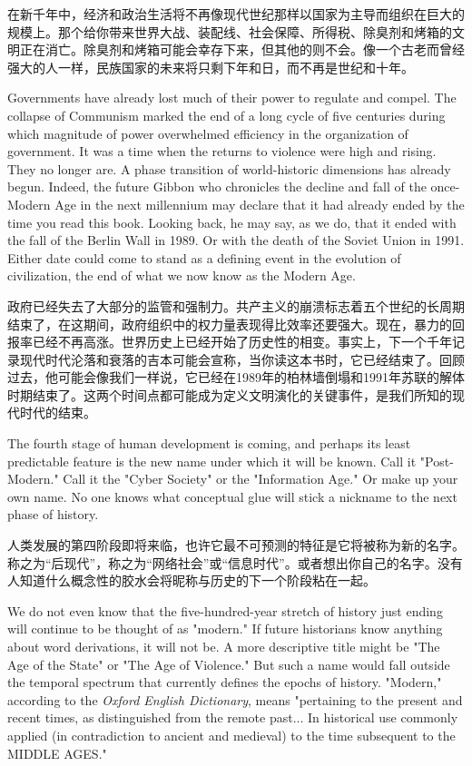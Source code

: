 \begin{Parallel}{97mm}{45mm}
  \ParallelRText
  {在新千年中，经济和政治生活将不再像现代世纪那样以国家为主导而组织在巨大的规模上。那个给你带来世界大战、装配线、社会保障、所得税、除臭剂和烤箱的文明正在消亡。除臭剂和烤箱可能会幸存下来，但其他的则不会。像一个古老而曾经强大的人一样，民族国家的未来将只剩下年和日，而不再是世纪和十年。}

  \ParallelPar

  \ParallelLText
  {Governments have already lost much of their power to regulate and compel. The collapse of Communism marked the end of a long cycle of five centuries during which magnitude of power overwhelmed efficiency in the organization of government. It was a time when the returns to violence were high and rising. They no longer are. A phase transition of world-historic dimensions has already begun. Indeed, the future Gibbon who chronicles the decline and fall of the once-Modern Age in the next millennium may declare that it had already ended by the time you read this book. Looking back, he may say, as we do, that it ended with the fall of the Berlin Wall in 1989. Or with the death of the Soviet Union in 1991. Either date could come to stand as a defining event in the evolution of civilization, the end of what we now know as the Modern Age.}

  \ParallelRText
  {政府已经失去了大部分的监管和强制力。共产主义的崩溃标志着五个世纪的长周期结束了，在这期间，政府组织中的权力量表现得比效率还要强大。现在，暴力的回报率已经不再高涨。世界历史上已经开始了历史性的相变。事实上，下一个千年记录现代时代沦落和衰落的吉本可能会宣称，当你读这本书时，它已经结束了。回顾过去，他可能会像我们一样说，它已经在1989年的柏林墙倒塌和1991年苏联的解体时期结束了。这两个时间点都可能成为定义文明演化的关键事件，是我们所知的现代时代的结束。}

  \ParallelPar

  \ParallelLText
  {The fourth stage of human development is coming, and perhaps its least predictable feature is the new name under which it will be known. Call it "Post-Modern." Call it the "Cyber Society" or the "Information Age." Or make up your own name. No one knows what conceptual glue will stick a nickname to the next phase of history.}
  
  \ParallelRText
  {人类发展的第四阶段即将来临，也许它最不可预测的特征是它将被称为新的名字。称之为“后现代”，称之为“网络社会”或“信息时代”。或者想出你自己的名字。没有人知道什么概念性的胶水会将昵称与历史的下一个阶段粘在一起。}

  \ParallelPar  

  \ParallelLText
  {We do not even know that the five-hundred-year stretch of history just ending will continue to be thought of as "modern." If future historians know anything about word derivations, it will not be. A more descriptive title might be "The Age of the State" or "The Age of Violence." But such a name would fall outside the temporal spectrum that currently defines the epochs of history. "Modern," according to the \emph{Oxford English Dictionary}, means "pertaining to the present and recent times, as distinguished from the remote past... In historical use commonly applied (in contradiction to ancient and medieval) to the time subsequent to the MIDDLE AGES."}
  

\end{Parallel}
